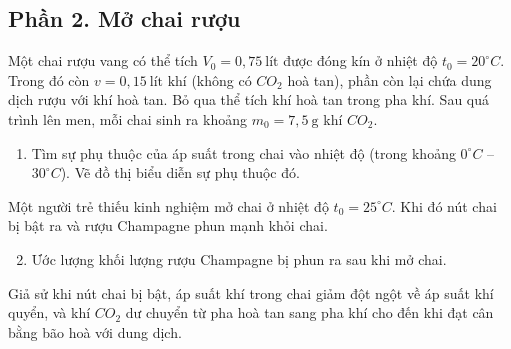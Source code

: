 \subsection*{Phần 2. Mở chai rượu}
\noindent Một chai rượu vang có thể tích $V_0 = 0{,}75~\text{lít}$ được đóng kín ở nhiệt độ $t_0 = 20^\circ C$. Trong đó còn $v = 0{,}15~\text{lít khí}$ (không có $CO_2$ hoà tan), phần còn lại chứa dung dịch rượu với khí hoà tan. Bỏ qua thể tích khí hoà tan trong pha khí. Sau quá trình lên men, mỗi chai sinh ra khoảng $m_0 = 7{,}5~\text{g}$ khí $CO_2$.
\begin{enumerate}
  \item Tìm sự phụ thuộc của áp suất trong chai vào nhiệt độ (trong khoảng $0^\circ C$ – $30^\circ C$). Vẽ đồ thị biểu diễn sự phụ thuộc đó.
\end{enumerate}
\noindent Một người trẻ thiếu kinh nghiệm mở chai ở nhiệt độ $t_0 = 25^\circ C$. Khi đó nút chai bị bật ra và rượu Champagne phun mạnh khỏi chai.
\begin{enumerate}
  \setcounter{enumi}{1}
  \item Ước lượng khối lượng rượu Champagne bị phun ra sau khi mở chai.
\end{enumerate}
Giả sử khi nút chai bị bật, áp suất khí trong chai giảm đột ngột về áp suất khí quyển, và khí $CO_2$ dư chuyển từ pha hoà tan sang pha khí cho đến khi đạt cân bằng bão hoà với dung dịch.
